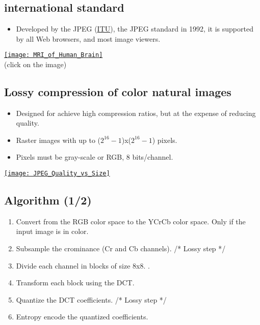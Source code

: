 \chapter{}

\section{ international standard}
\begin{itemize}
\item Developed by the \gls{JPEG} (\href{https://www.itu.int}{ITU}),
  the \gls{JPEG} standard \cite{ccitt.t81} in 1992, it is supported by
  all Web browsers, and most image viewers.
\end{itemize}
\vspace{-2ex}
\begin{center}
  \href{https://en.wikipedia.org/wiki/Magnetic_resonance_imaging_of_the_brain#/media/File:MRI_of_Human_Brain.jpg}{\texttt{[image: MRI\_of\_Human\_Brain]}}\\
  (click on the image)
\end{center}

\section{Lossy compression of color natural images}
\begin{itemize}
\item Designed for achieve high compression ratios, but at the expense of reducing quality.
  \item Raster images with up to ($2^{16}-1$)x($2^{16}-1$) pixels.
  \item Pixels must be gray-scale or \gls{RGB}, 8 bits/channel.
\end{itemize}
\vspace{-2ex}
\begin{center}
  \href{https://www.thewebmaster.com/jpeg-definitive-guide/}{\texttt{[image: JPEG\_Quality\_vs\_Size]}}
\end{center}

\section{Algorithm (1/2)}
\begin{enumerate}
\item Convert from the \gls{RGB} color space to the \gls{YCrCb} color
  space. Only if the input image is in color.
\item Subsample the crominance (Cr and Cb channels). /* Lossy step */
\item Divide each channel in blocks of size 8x8. .
\item Transform each block using the \gls{DCT}.
\item Quantize the \gls{DCT} coefficients. /* Lossy step */
\item Entropy encode the quantized coefficients.
\end{enumerate}

